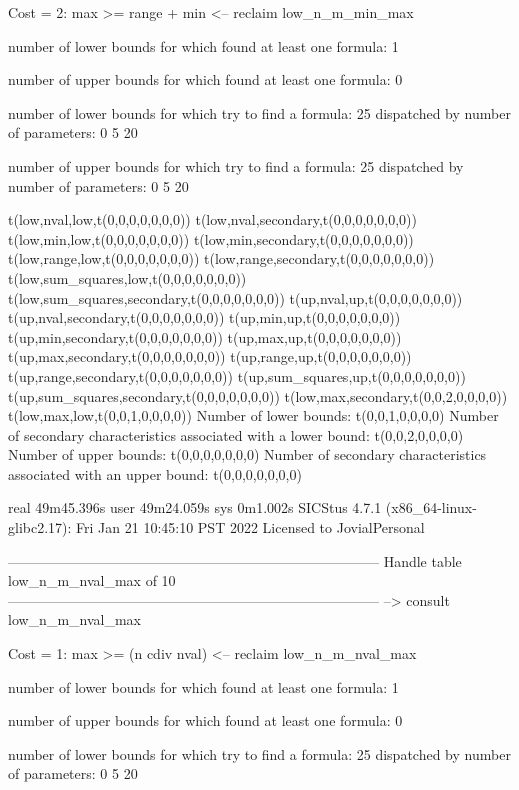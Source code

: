 Cost =  2:  max >= range + min
<-- reclaim low_n_m_min_max

number of lower bounds for which found at least one formula: 1

number of upper bounds for which found at least one formula: 0

number of lower bounds for which try to find a formula: 25
dispatched by number of parameters: 0  5  20

number of upper bounds for which try to find a formula: 25
dispatched by number of parameters: 0  5  20

t(low,nval,low,t(0,0,0,0,0,0,0))
t(low,nval,secondary,t(0,0,0,0,0,0,0))
t(low,min,low,t(0,0,0,0,0,0,0))
t(low,min,secondary,t(0,0,0,0,0,0,0))
t(low,range,low,t(0,0,0,0,0,0,0))
t(low,range,secondary,t(0,0,0,0,0,0,0))
t(low,sum_squares,low,t(0,0,0,0,0,0,0))
t(low,sum_squares,secondary,t(0,0,0,0,0,0,0))
t(up,nval,up,t(0,0,0,0,0,0,0))
t(up,nval,secondary,t(0,0,0,0,0,0,0))
t(up,min,up,t(0,0,0,0,0,0,0))
t(up,min,secondary,t(0,0,0,0,0,0,0))
t(up,max,up,t(0,0,0,0,0,0,0))
t(up,max,secondary,t(0,0,0,0,0,0,0))
t(up,range,up,t(0,0,0,0,0,0,0))
t(up,range,secondary,t(0,0,0,0,0,0,0))
t(up,sum_squares,up,t(0,0,0,0,0,0,0))
t(up,sum_squares,secondary,t(0,0,0,0,0,0,0))
t(low,max,secondary,t(0,0,2,0,0,0,0))
t(low,max,low,t(0,0,1,0,0,0,0))
Number of lower bounds:                                             t(0,0,1,0,0,0,0)
Number of secondary characteristics associated with a lower bound:  t(0,0,2,0,0,0,0)
Number of upper bounds:                                             t(0,0,0,0,0,0,0)
Number of secondary characteristics associated with an upper bound: t(0,0,0,0,0,0,0)

real	49m45.396s
user	49m24.059s
sys	0m1.002s
SICStus 4.7.1 (x86_64-linux-glibc2.17): Fri Jan 21 10:45:10 PST 2022
Licensed to JovialPersonal


--------------------------------------------------------------------------------
Handle table low_n_m_nval_max of 10
--------------------------------------------------------------------------------
--> consult low_n_m_nval_max

Cost =  1:  max >= (n cdiv nval)
<-- reclaim low_n_m_nval_max

number of lower bounds for which found at least one formula: 1

number of upper bounds for which found at least one formula: 0

number of lower bounds for which try to find a formula: 25
dispatched by number of parameters: 0  5  20

